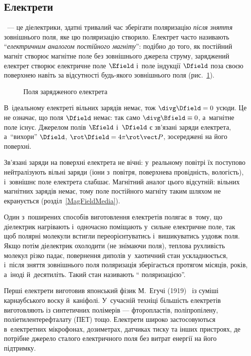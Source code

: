 \subsection*{Електрети}


~--- це діелектрики, здатні тривалий час зберігати
поляризацію \emph{після зняття} зовнішнього поля, яке цю поляризацію створило. Електрет
часто називають \enquote{\emph{електричним аналогом постійного магніту}}: подібно до того,
як постійний магніт створює магнітне поле без зовнішнього джерела струму, заряджений
електрет створює електричне поле $\Efield$ і~поле індукції $\Dfield$ поза своєю поверхнею
навіть за відсутності будь-якого зовнішнього поля (рис.~\ref{pic:Electret}).

\begin{figure}[h!]\centering
	\caption{Поля зарядженого електрета\label{pic:Electret}}
\end{figure}

В~ідеальному електреті вільних зарядів немає, тож $\divg\Dfield = 0$ усюди. Це не означає,
що поля $\Dfield$ немає: так само $\divg\Bfield \equiv 0$, а~магнітне поле існує. Джерелом
полів $\Efield$ і~$\Dfield$ є зв'язані заряди електрета, а~\enquote{вихори} $\Dfield$,
$\rot\Dfield = 4\pi\rot\vect P$, зосереджені на його поверхні.

Зв'язані заряди на поверхні електрета не вічні: у~реальному повітрі їх поступово нейтралізують вільні заряди (іони з~повітря, поверхнева провідність, вологість), і~зовнішнє поле електрета слабшає. Магнітний аналог цього відсутній: вільних магнітних зарядів немає, тому поле постійного магніту таким шляхом не екранується (розділ~\ref{MagFieldMedia}).

Один з~поширених способів виготовлення електретів полягає в~тому, що діелектрик нагрівають
і~одночасно поміщають у~сильне електричне поле, так щоб полярні молекули встигли
переорієнтуватись і~вишикуватись уздовж поля. Якщо потім діелектрик охолодити (не знімаючи
поля), теплова рухливість молекул різко падає, повернення диполів у~хаотичний стан
ускладнюється, і~після зняття зовнішнього поля поляризація зберігається протягом місяців,
років, а~іноді й~десятиліть. Такий стан називають \enquote{
	поляризацією}.

Перші електрети виготовив японський фізик М.~Егучі (1919)~\cite{Eguchi1925} із суміші карнаубського воску
й~каніфолі. У~сучасній техніці
більшість електретів виготовляють із синтетичних полімерів --- фторопластів,
поліпропілену, поліетилентерефталату (ПЕТ) тощо. Електрети широко застосовуються
в~електретних мікрофонах, дозиметрах, датчиках тиску та інших пристроях, де потрібне
джерело сталого електричного поля без витрат енергії на його підтримку.


